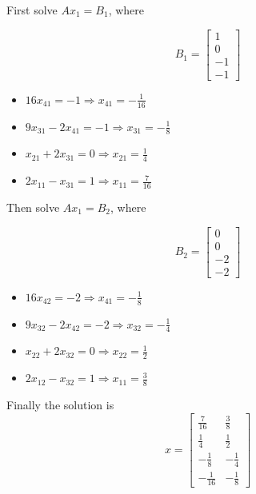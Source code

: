 \begin{exercise}{1}
First solve $Ax_1=B_1$, where 

$$B_1= 
\begin{bmatrix}
1\\ 0\\ -1 \\ -1
\end{bmatrix}
$$ 

\begin{itemize}
    \item $16x_{41} = -1 \Longrightarrow x_{41} = -\frac{1}{16}$ 
    \item $9x_{31} - 2x_{41} = -1 \Longrightarrow x_{31} = -\frac{1}{8}$ 
    \item $x_{21} + 2x_{31} = 0 \Longrightarrow x_{21} = \frac{1}{4}$ 
    \item $2x_{11} - x_{31} = 1 \Longrightarrow x_{11} = \frac{7}{16}$ 
\end{itemize}

Then solve $Ax_1=B_2$, where 

$$B_2= 
\begin{bmatrix}
0\\ 0\\ -2 \\ -2
\end{bmatrix}
$$ 

\begin{itemize}
    \item $16x_{42} = -2 \Longrightarrow x_{41} = -\frac{1}{8}$ 
    \item $9x_{32} - 2x_{42} = -2 \Longrightarrow x_{32} = -\frac{1}{4}$ 
    \item $x_{22} + 2x_{32} = 0 \Longrightarrow x_{22} = \frac{1}{2}$ 
    \item $2x_{12} - x_{32} = 1 \Longrightarrow x_{11} = \frac{3}{8}$ 
\end{itemize}

Finally the solution is
$$x= 
\begin{bmatrix}
\frac{7}{16} & \frac{3}{8}\\ 
\frac{1}{4} & \frac{1}{2}\\ 
-\frac{1}{8} & -\frac{1}{4}\\ 
-\frac{1}{16} & -\frac{1}{8}
\end{bmatrix}
$$ 

\end{exercise}

